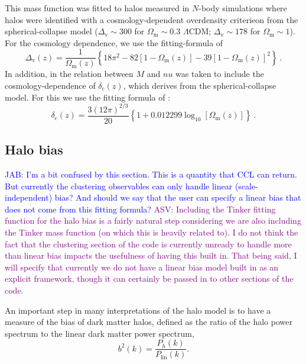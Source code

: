 \documentclass[\docopts]{\docclass}
\newcommand{\asv}[1]{\textcolor{purple}{ASV: #1}}
\newcommand{\jab}[1]{\textcolor{blue}{JAB: #1}}
\begin{document}
This mass function was fitted to halos measured in $N$-body simulations where halos were identified with a cosmology-dependent overdensity criterieon from the spherical-collapse model ($\Delta_\mathrm{v}\sim 300$ for $\Omega_\mathrm{m}\sim 0.3$ $\Lambda$CDM; $\Delta_\mathrm{v}\sim 178$ for $\Omega_\mathrm{m}\sim 1$). For the cosmology dependence, we use the fitting-formula of \cite{Bryan1998}
\begin{equation}
\Delta_\mathrm{v}(z)=\frac{1}{\Omega_\mathrm{m}(z)}\left\{18\pi^2-82[1-\Omega_\mathrm{m}(z)]-39[1-\Omega_\mathrm{m}(z)]^2\right\}\ .
\label{eq:Deltav_Bryan}
\end{equation}
In addition, in \cite{Sheth1999} the relation between $M$ and $nu$ was taken to include the cosmology-dependence of $\delta_\mathrm{c}(z)$, which derives from the spherical-collapse model. For this we use the fitting formula of \cite{Nakamura1997}:
\begin{equation}
\delta_\mathrm{c}(z)=\frac{3(12\pi)^{2/3}}{20}\left\{1+0.012299\log_{10}[\Omega_\mathrm{m}(z)]\right\}\ .
\label{eq:deltac_Nakamura}
\end{equation}


\subsection{Halo bias}

\jab{I'm a bit confused by this section. This is a quantity that CCL can return. But currently the clustering observables can only handle linear (scale-independent) bias? And should we say that the user can specify a linear bias that does not come from this fitting formula?}
\asv{Including the Tinker fitting function for the halo bias is a fairly natural step considering we are also including the Tinker mass function (on which this is heavily related to). I do not think the fact that the clustering section of the code is currently unready to handle more than linear bias impacts the usefulness of having this built in. That being said, I will specify that currently we do not have a linear bias model built in as an explicit framework, though it can certainly be passed in to other sections of the code.}

An important step in many interpretations of the halo model is to have a measure of the bias of dark matter halos, defined as the ratio of the halo power spectrum to the linear dark matter power spectrum,
\begin{equation}
  b^2(k) = \frac{P_h(k)}{P_{\mathrm{lin}}(k)}.
  \label{eq:halo_bias}
\end{equation}
\end{document}

